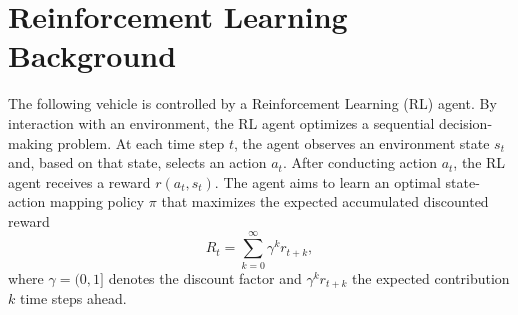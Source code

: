 \documentclass[review]{elsarticle}
\providecommand{\3}{{\ss}}
\begin{document}
\section{Reinforcement Learning Background}
\label{sec:RLBackground}

The following vehicle is controlled by a Reinforcement
Learning (RL) agent. By interaction with an environment, the RL agent
optimizes a sequential decision-making problem. At each time step
$t$, the agent observes an environment state $s_t$ and, based on that state, selects
an action $a_t$. After conducting action $a_t$, the RL agent receives
a reward $r(a_t,s_t)$. The agent aims to learn an optimal state-action
mapping policy $\pi$ that maximizes the expected accumulated
discounted reward
\begin{equation}
\label{Rt}
R_{t}=\sum_{k=0}^{\infty} \gamma^{k} r_{t+k},
\end{equation}
 where $\gamma = (0,1]$ denotes the discount factor and 
$\gamma^k r_{t+k}$ the expected contribution $k$ time steps ahead. 
\end{document}

